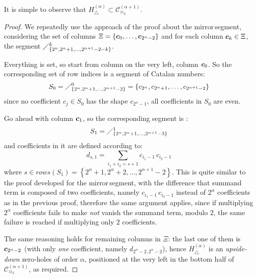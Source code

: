 It is simple to observe that $H_{\bigtriangleup}^{({\alpha})}\subset
\mathcal{C}_{\equiv_{2}}^{(\alpha+1)}$. 

\begin{proof}
We repeatedly use the approach
of the proof about the \flqq mirror\frqq\,segment, considering the set of columns 
$\Xi=\lbrace \boldsymbol{c}_{0},\ldots, \boldsymbol{c}_{2^{{\alpha}}-2}\rbrace$ and
for each column $\boldsymbol{c}_{k}\in\Xi$, the segment
    $\diagup_{\lbrace 2^{\alpha},2^{\alpha}+1,\ldots,2^{\alpha+1}-2-k\rbrace}^{k}$.

Everything is set, so start from column on the very left, column $\boldsymbol{c}_{0}$.
So the corresponding set of row indices  is a segment of Catalan numbers:
\begin{displaymath}
    S_{0}=\diagup_{\lbrace 2^{\alpha},2^{\alpha}+1,\ldots,2^{\alpha+1}-2\rbrace}^{0}
        = \lbrace c_{2^{\alpha}},c_{2^{\alpha}+1},\ldots,c_{2^{\alpha+1}-2}\rbrace
\end{displaymath}
since no coefficient $c_{j}\in S_{0}$ has the shape $c_{2^{\alpha}-1}$, 
all coefficients in $S_{0}$ are even.

Go ahead with column $\boldsymbol{c}_{1}$, so the corresponding segment is :
\begin{displaymath}
    S_{1}=\diagup_{\lbrace 2^{\alpha},2^{\alpha}+1,\ldots,2^{\alpha+1}-3\rbrace}^{1}
\end{displaymath}
and coefficients in it are defined according to:
\begin{displaymath}
    d_{s, 1} = \sum_{i_{1}+i_{2}=s+1} {c_{i_{1}-1}\,c_{i_{2}-1}}
\end{displaymath}
where $s\in rows(S_{1})= \left\lbrace 2^{\alpha}+1,2^{\alpha}+2,\ldots,2^{\alpha+1}-2\right\rbrace$. 
This is quite similar to the proof developed for the \flqq mirror\frqq\,segment,
with the difference that summand term is composed of two coefficients, namely
$c_{i_{1}-1}\,c_{i_{2}-1}$ instead of $2^{{\alpha}}$ coefficients as in the previous proof, 
therefore the same argument applies,
since if multiplying $2^{{\alpha}}$ coefficients fails to make \emph{not} vanish
the summand term, modulo $2$, the same failure is reached if multiplying only $2$ coefficients.

The same reasoning holds for remaining columns in $\Xi$: the last one of them is 
$\boldsymbol{c}_{2^{\alpha}-2}$ (with only \emph{one} coefficient, namely $d_{2^{\alpha}-2,2^{\alpha}-2}$), 
hence $H_{\bigtriangleup}^{({\alpha})}$ is an \emph{upside-down} zero-holes of order $\alpha$,
positioned at the very left in the bottom half of $\mathcal{C}_{\equiv_{2}}^{(\alpha+1)}$, as required.

\end{proof}

